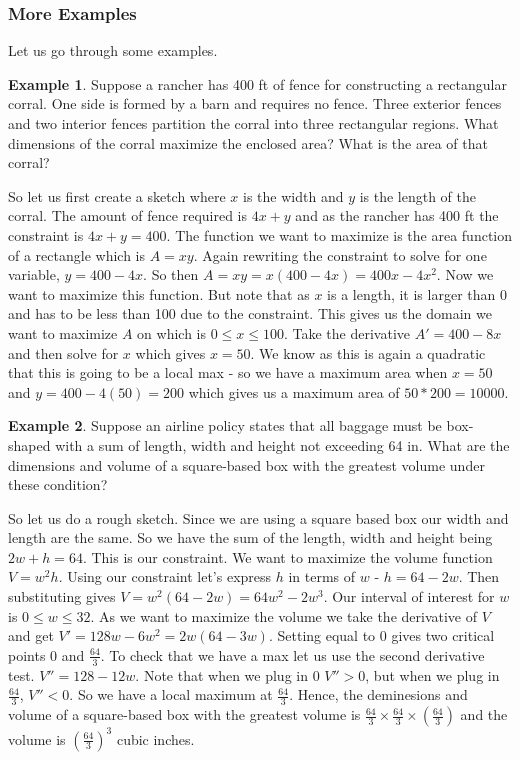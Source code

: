 \documentclass[12pt,reqno]{article}
\theoremstyle{definition}
\newtheorem*{Example}{Example}
\begin{document}
\subsubsection{More Examples}
	Let us go through some examples. 
	\begin{Example}
		Suppose a rancher has 400 ft of fence for constructing a rectangular corral. One side is formed by a barn and requires no fence. Three exterior fences and two interior fences partition the corral into three rectangular regions. What dimensions of the corral maximize the enclosed area? What is the area of that corral? 
		
		So let us first create a sketch where $x$ is the width and $y$ is the length of the corral. The amount of fence required is $4x + y$ and as the rancher has 400 ft the constraint is $4x + y = 400$. The function we want to maximize is the area function of a rectangle which is $A = xy$. Again rewriting the constraint to solve for one variable, $y = 400 - 4x$. So then $A = xy = x(400 - 4x) = 400x - 4x^2$. Now we want to maximize this function. But note that as $x$ is a length, it is larger than 0 and has to be less than 100 due to the constraint. This gives us the domain we want to maximize $A$ on which is $0 \leq x \leq 100$. Take the derivative $A' = 400 - 8x$ and then solve for $x$ which gives $x = 50$. We know as this is again a quadratic that this is going to be a local max - so we have a maximum area when $x = 50$ and $y = 400 - 4(50) = 200$ which gives us a maximum area of $50*200 = 10000$. 
	\end{Example}
	
	\begin{Example}
		Suppose an airline policy states that all baggage must be box-shaped with a sum of length, width and height not exceeding 64 in. What are the dimensions and volume of a square-based box with the greatest volume under these condition? 
		
		So let us do a rough sketch. Since we are using a square based box our width and length are the same. So we have the sum of the length, width and height being $2w + h = 64$. This is our constraint. We want to maximize the volume function $V = w^2 h$. Using our constraint let's express $h$ in terms of $w$ - $h = 64 - 2w$. Then substituting gives $V = w^2 (64 - 2w) = 64w^2 - 2 w^3$. Our interval of interest for $w$ is $0 \leq w \leq 32$. As we want to maximize the volume we take the derivative of $V$ and get $V' = 128 w - 6w^2 = 2w(64 - 3w)$. Setting equal to 0 gives two critical points 0 and $\frac{64}{3}$. To check that we have a max let us use the second derivative test. $V'' = 128 - 12w$. Note that when we plug in $0$ $V''>0$, but when we plug in $\frac{64}{3}$, $V'' < 0$. So we have a local maximum at $\frac{64}{3}$. Hence, the deminesions and volume of a square-based box with the greatest volume is $\frac{64}{3} \times \frac{64}{3} \times \left(\frac{64}{3}\right)$ and the volume is $\left(\frac{64}{3}\right)^3$ cubic inches.  
	\end{Example}
	
\end{document}
